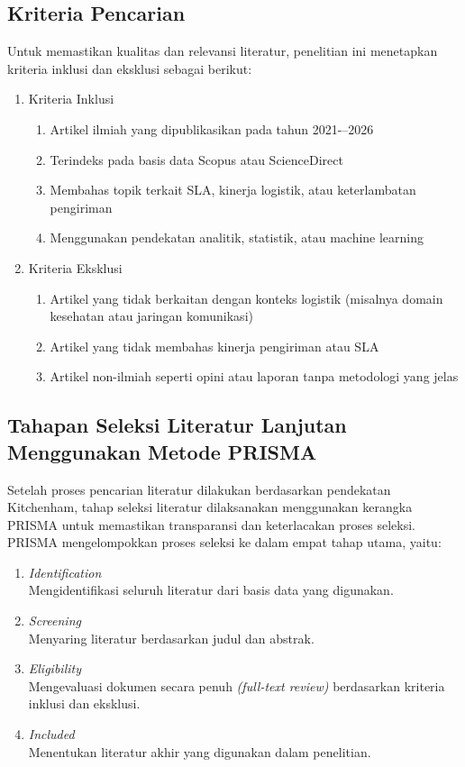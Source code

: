 \subsection{Kriteria Pencarian}
Untuk memastikan kualitas dan relevansi literatur, penelitian ini menetapkan kriteria inklusi dan eksklusi sebagai berikut:


\begin{enumerate}
    \item Kriteria Inklusi
        \begin{enumerate}
            \item Artikel ilmiah yang dipublikasikan pada tahun 2021-–2026
            \item Terindeks pada basis data Scopus atau ScienceDirect
            \item Membahas topik terkait SLA, kinerja logistik, atau keterlambatan pengiriman
            \item Menggunakan pendekatan analitik, statistik, atau machine learning
        \end{enumerate}
    \item Kriteria Eksklusi
        \begin{enumerate}
            \item Artikel yang tidak berkaitan dengan konteks logistik (misalnya domain kesehatan atau jaringan komunikasi)
            \item Artikel yang tidak membahas kinerja pengiriman atau SLA
            \item Artikel non-ilmiah seperti opini atau laporan tanpa metodologi yang jelas
        \end{enumerate}
\end{enumerate}

\subsection{Tahapan Seleksi Literatur Lanjutan Menggunakan Metode PRISMA}

Setelah proses pencarian literatur dilakukan berdasarkan pendekatan Kitchenham, tahap seleksi literatur dilaksanakan menggunakan kerangka PRISMA untuk memastikan transparansi dan keterlacakan proses seleksi. PRISMA mengelompokkan proses seleksi ke dalam empat tahap utama, yaitu:
\begin{enumerate}
    \item \textit{Identification} \\ Mengidentifikasi seluruh literatur dari basis data yang digunakan.
    \item \textit{Screening} \\ Menyaring literatur berdasarkan judul dan abstrak.
    \item \textit{Eligibility} \\ Mengevaluasi dokumen secara penuh \textit{(full-text review)} berdasarkan kriteria inklusi dan eksklusi. 
    \item \textit{Included} \\ Menentukan literatur akhir yang digunakan dalam penelitian.
\end{enumerate}


